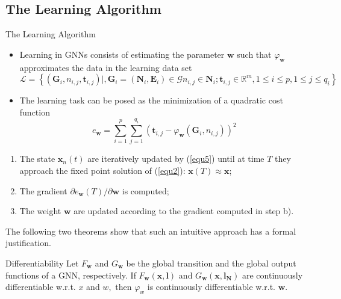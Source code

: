 \documentclass[10pt,aspectratio=169]{beamer}
\begin{document}
\subsection{The Learning Algorithm}
\begin{frame}[allowframebreaks]{The Learning Algorithm}
    \begin{itemize}
        \item Learning in GNNs consists of estimating the parameter $\boldsymbol{w}$ such that $\varphi_{\boldsymbol{w}}$ approximates the data in the learning data set
              $$
                  \mathcal{L}=\left\{\left(\boldsymbol{G}_{i}, n_{i, j}, \boldsymbol{t}_{i, j}\right) \mid, \boldsymbol{G}_{i}=\left(\boldsymbol{N}_{i}, \boldsymbol{E}_{i}\right) \in \mathcal{G}
                  n_{i, j} \in \boldsymbol{N}_{i} ; \boldsymbol{t}_{i, j} \in \mathbb{R}^{m}, 1 \leq i \leq p, 1 \leq j \leq q_{i}\right\}
              $$
        \item The learning task can be posed as the minimization of a quadratic cost function
              \begin{equation}
                  e_{\boldsymbol{w}}=\sum_{i=1}^{p} \sum_{j=1}^{q_{i}}\left(\boldsymbol{t}_{i, j}-\varphi_{\boldsymbol{w}}\left(\boldsymbol{G}_{i}, n_{i, j}\right)\right)^{2}
              \end{equation}
    \end{itemize}

    \framebreak

    \begin{enumerate}[a]
        \item The state $\boldsymbol{x}_n(t)$ are iteratively updated by (\ref{equ5}) until at time $T$ they approach the fixed point solution of (\ref{equ2}): $\boldsymbol{x}(T) \approx \boldsymbol{x}$;
        \item The gradient $\partial e_{\boldsymbol{w}}(T) / \partial \boldsymbol{w}$ is computed;
        \item The weight $\boldsymbol{w}$ are updated according to the gradient computed in step b).
    \end{enumerate}

    \framebreak

    The following two theorems show that such an intuitive
    approach has a formal justification.

    \begin{theorem}{Differentiability}
        Let $F_{\boldsymbol{w}}$ and $G_{\boldsymbol{w}}$ be the global transition and the global output functions of a GNN, respectively. If $F_{\boldsymbol{w}}(\boldsymbol{x}, \boldsymbol{l})$ and $G_{\boldsymbol{w}}\left(\boldsymbol{x}, \boldsymbol{l}_{\boldsymbol{N}}\right)$ are continuously differentiable w.r.t. $x$ and $w,$ then $\varphi_{w}$ is continuously differentiable w.r.t. $\boldsymbol{w}$.
    \end{theorem}


\end{frame}
\end{document}
